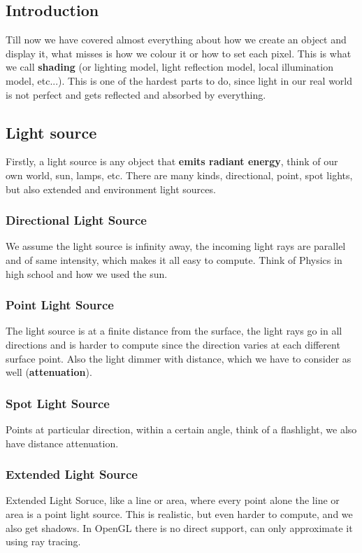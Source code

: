 \documentclass[11pt]{article}
\begin{document}
\subsection{Introduction}
Till now we have covered almost everything about how we create an object and display it, what misses is how we colour it or how to set each pixel. This is what we call \textbf{shading} (or lighting model, light reflection model, local illumination model, etc...).
This is one of the hardest parts to do, since light in our real world is not perfect and gets reflected and absorbed by everything.  
\subsection{Light source}
Firstly, a light source is any object that \textbf{emits radiant energy}, think of our own world, sun, lamps, etc. There are many kinds, directional, point, spot lights, but also extended and environment light sources.

\subsubsection*{Directional Light Source}
We assume the light source is infinity away, the incoming light rays are parallel and of same intensity, which makes it all easy to compute. Think of Physics in high school and how we used the sun. 
\subsubsection*{Point Light Source}
The light source is at a finite distance from the surface, the light rays go in all directions and is harder to compute since the direction varies at each different surface point. Also the light dimmer with distance, which we have to consider as well (\textbf{attenuation}).

\subsubsection*{Spot Light Source}
Points at particular direction, within a certain angle, think of a flashlight, we also have distance attenuation. 

\subsubsection*{Extended Light Source}
Extended Light Soruce, like a line or area, where every point alone the line or area is a point light source. This is realistic, but even harder to compute, and we also get shadows. In OpenGL there is no direct support, can only approximate it using ray tracing.
\end{document}
